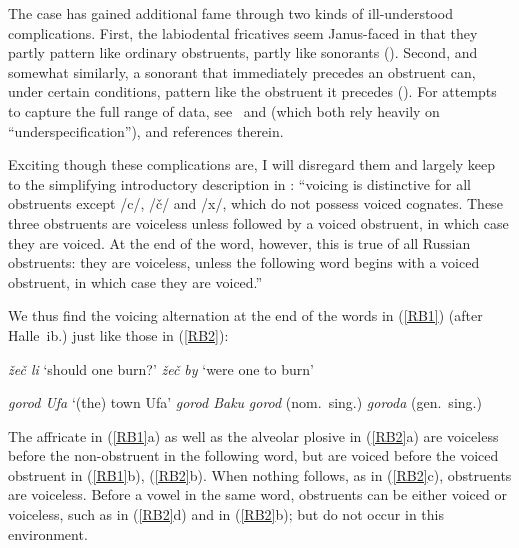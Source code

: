 \documentclass[output=paper]{langsci/langscibook}
\begin{document}
The case has gained additional fame through two kinds of ill-under\-stood
complications. First, the labiodental fricatives seem Janus-faced in that
they partly pattern like ordinary obstruents, partly like sonorants
(\citealt{jako:56}). Second, and somewhat similarly, a
sonorant that immediately precedes an obstruent can, under certain
conditions, pattern like the obstruent it precedes
(\citealt{jako:78}). For attempts to capture the full
range of data, see~\cite{whee:88} and
\cite[{}\S{}2]{kipa:85} (which both rely heavily on
``underspecification''), and references therein.

Exciting though these complications are, I will disregard them and largely
keep to the simplifying introductory description
in \cite[22]{hall:59}: ``voicing is distinctive for
all obstruents except /c/, /\v{c}/ and /x/, which do not possess voiced
cognates. These three obstruents are voiceless un\-less followed by a
voiced obstruent, in which case they are voiced. At the end of the word,
however, this is true of all Russian obstruents: they are voiceless, unless
the following word begins with a voiced obstruent, in which case they are
voiced.''

\largerpage
We thus find the voicing alternation at the end of the words in (\ref{RB1})
(after Halle~ib.\@\nocite{hall:59}) just like those
in (\ref{RB2}):
\begin{exe}
\ex
\label{RB1}
\begin{xlist}
\ex
\emph{\v{z}e\v{c} li}
 `should one burn?'
%
\ex
\emph{\v{z}e\v{c} by}  \textipa{[ZedZb1]} `were one to burn'
\end{xlist}
\end{exe}
% 
\begin{exe}
\ex
\label{RB2}
\begin{xlist}
\ex
\emph{gorod Ufa}   `(the) town Ufa'
%
\ex
\emph{gorod Baku}  
%
\ex
\emph{gorod} \textipa{[gOr@t]} (nom.\ sing.)
%
\ex
\emph{goroda} \textipa{[gOr@d@]} (gen.\ sing.)
\end{xlist}
\end{exe}
% 
The affricate in (\ref{RB1}a) as well as the alveolar plosive
in (\ref{RB2}a) are voiceless before the non-obstruent in the following
word, but are voiced before the voiced obstruent in (\ref{RB1}b),
(\ref{RB2}b).  When nothing follows, as in (\ref{RB2}c), obstruents are
voiceless. Before a vowel in the same word, obstruents can be either voiced
or voiceless, such as \textipa{[d]} in (\ref{RB2}d) and \textipa{[k]}
in (\ref{RB2}b); but \textipa{[dZ, dz, G]} do not occur in this environment.
\end{document}
